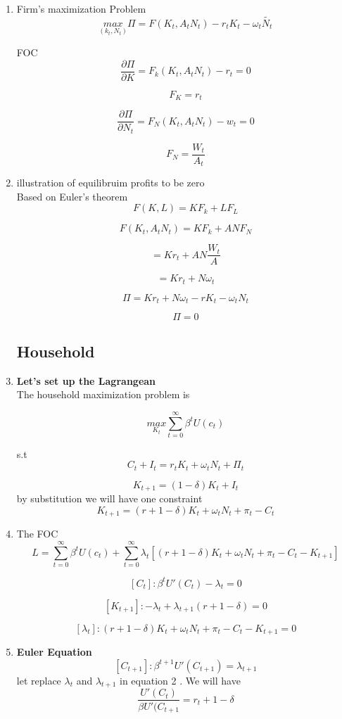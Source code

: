 \documentclass[12pt]{article}
\numberwithin{equation}{subsection} %
\begin{document}
\begin{enumerate}
  \item {Firm's maximization Problem}
$$
 \underset{(k_{t},N_{t})}{max} \Pi=F(K_{t},A_{t }N_{t}) - r_{t} K_{t}- \omega_{t} \tilde{N_{t}}
$$

FOC
$$
\frac{\partial \Pi}{\partial K}=F_{k}(K_{t},A_{t} N_{t}) - r_{t }=0
$$

$$
F_{K}= r_{t}
$$

$$
\frac{\partial \Pi}{\partial N_{t}}=F_{N}(K_t,A_{t} N{_t}) - w_t =0
$$

$$
F_{N}=\frac{ W_t}{A_t}
$$
\item {illustration of  equilibruim profits to be  zero}\\


Based on Euler's theorem
$$
F(K,L)= KF_{k} + LF_{L}
$$

$$
F(K_t,A_t N_t)= KF_{k }+ANF_{N}
$$

$$
= Kr_{t} + AN\frac{W_{t}}{A}
$$

$$
= Kr_{t }+N\omega_{t}
$$

$$
\Pi= Kr_{t} + N\omega_{t} - rK_{t }- \omega_{t }N_{t}
$$

$$
\Pi= 0
$$

\subsection{Household}
\item \textbf{Let's set up the  Lagrangean} \\
The household maximization problem is

$$
\underset{K_{t}}{max} \sum_{t=0}^{\infty} \beta^t U(c_t)
$$


s.t
$$
C_{t }+I_{t}= r_{t }K_{t }+ \omega_{t }N_{t}  +\Pi_{t}
$$

$$
K_{t+1}= (1-\delta)K_{t }+I_{t}
$$
by substitution we will have one constraint
$$
K_{t+1}= ( r+1-\delta) K_{t }+ \omega_{t} N_{t }+\pi_{t} - C_{t}
$$
\item The FOC \\

$$
L=\sum_{t=0}^{\infty} \beta^{t }U(c_{t}) + \sum_{t=0}^{\infty} \lambda_{t}[  ( r+1-\delta) K_{t} + \omega_{t} N_{t} +\pi_{t} - C_{t} -K_{t+1}]
$$

$$
[C_t] : \beta^t U'(C_{t})- \lambda_t =0
$$

$$
[K_{t+1}]: -\lambda_{t }+ \lambda_{t+1} ( r+1-\delta) =0
$$

$$
[\lambda_{t}]:  ( r+1-\delta) K_{t} + \omega_{t }N_{t} +\pi_{t} - C_{t} -K_{t+1} =0
$$
\item \textbf{Euler Equation}\\
$$
[ C_{t+1}] : \beta^{t+1} U\prime( C_{t+1})= \lambda_{t+1}
$$
let replace  $\lambda_t$  and  $\lambda_{t+1}$ in equation 2 . We will have
$$
 \frac{U\prime( C_t)}{\beta U\prime( C_{t+1} }= r_{t }+1-\delta
$$

\end{enumerate}
\end{document}
